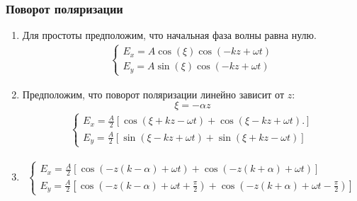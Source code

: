 \documentclass[10pt,pdf,hyperref={unicode}, dvipsnames]{beamer}
\begin{document}

\begin{frame}

	\frametitle{Поворот поляризации}
	\begin{enumerate} 
		\item
		      Для простоты предположим, что начальная фаза волны равна нулю.
		      \begin{gather*}
			      \begin{cases} 
				      E_x = A\cos(\xi)\cos\left(-kz+\omega t\right) \\
				      E_y = A\sin(\xi)\cos\left(-kz+\omega t\right)
			      \end{cases}
		      \end{gather*}
		\item
		      Предположим, что поворот поляризации линейно зависит от $z$:
		      \begin{equation*}
			      \xi=-\alpha z
		      \end{equation*}
		      \begin{gather*}
			      \begin{cases} 
				      E_x = \frac{A}{2}\left[
					      \cos\left(
					      \xi+kz-\omega t
					      \right)+
					      \cos\left(
					      \xi-kz+\omega t
					      \right)
					      .\right] \\
				      E_y = \frac{A}{2}\left[
					      \sin\left(
					      \xi-kz+\omega t
					      \right)+
					      \sin\left(
					      \xi+kz-\omega t
					      \right)
					      \right]
			      \end{cases}
		      \end{gather*}
		\item
		      \begin{gather*}
			      \begin{cases} 
				      E_x = \frac{A}{2}\left[
					      \cos\left(
					      -z(k-\alpha)+\omega t
					      \right)+
					      \cos\left(
					      -z(k+\alpha)+\omega t
					      \right)
					      \right] \\
				      E_y = \frac{A}{2}\left[
					      \cos\left(
					      -z(k-\alpha)+\omega t+\frac{\pi}{2}
					      \right)+
					      \cos\left(
					      -z(k+\alpha)+\omega t-\frac{\pi}{2}
					      \right)
					      \right]
			      \end{cases}
		      \end{gather*}
	\end{enumerate}
\end{frame}
\end{document}
